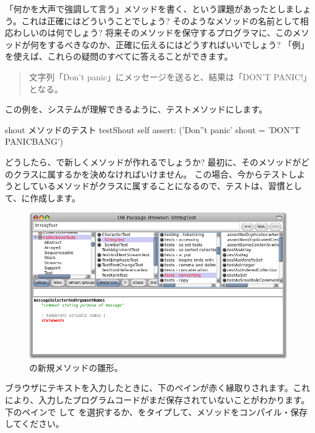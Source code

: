 \documentclass[a4paper,10pt,twoside]{book}
\begin{document}
「何かを大声で強調して言う」メソッドを書く、という課題があったとしましょう。これは正確にはどういうことでしょう? そのようなメソッドの名前として相応わしいのは何でしょう? 将来そのメソッドを保守するプログラマに、このメソッドが何をするべきなのか、正確に伝えるにはどうすればいいでしょう? 「例」を使えば、これらの疑問のすべてに答えることができます。

\begin{quote}
文字列「Don't panic」にメッセージを送ると、結果は「DON'T PANIC!」となる。
\end{quote}

\noindent
この例を、システムが理解できるように、テストメソッドにします。

\begin{method}[testShout]{shout メソッドのテスト}
testShout
	self assert: ('Don''t panic' shout = 'DON''T PANICBANG')
\end{method} %

どうしたら、\pharo で新しくメソッドが作れるでしょうか? 最初に、そのメソッドがどのクラスに属するかを決めなければいけません。
この場合、今からテストしようとしているメソッドがクラスに属することになるので、テストは、習慣として、に作成します。

\begin{figure}[hbt]
\centerline {\includegraphics[width=\textwidth]{StringTest-newMethodTemplate}}
\caption{の新規メソッドの雛形。
}
\end{figure}

ブラウザにテキストを入力したときに、下のペインが赤く縁取りされます。これにより、入力したプログラムコードがまだ保存されていないことがわかります。
下のペインで \actclick して を選択するか、をタイプして、メソッドをコンパイル・保存してください。
\end{document}
